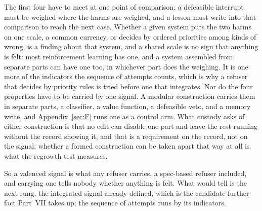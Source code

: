 The first four have to meet at one point of comparison: a defeasible interrupt must be weighed where the harms are weighed, and a lesson must write into that comparison to reach the next case.
Whether a given system puts the two harms on one scale, a common currency, or decides by ordered priorities among kinds of wrong, is a finding about that system, and a shared scale is no sign that anything is felt: most reinforcement learning has one, and a system assembled from separate parts can have one too, in whichever part does the weighing. It is one more of the indicators the sequence of attempts counts, which is why a refuser that decides by priority rules is tried before one that integrates. Nor do the four properties have to be carried by one signal. A modular construction carries them in separate parts, a classifier, a value function, a defeasible veto, and a memory write, and Appendix~\ref{sec:F} runs one as a control arm. What custody asks of either construction is that no edit can disable one part and leave the rest running without the record showing it, and that is a requirement on the record, not on the signal; whether a formed construction can be taken apart that way at all is what the regrowth test measures.

So a valenced signal is what any refuser carries, a spec-based refuser included, and carrying one tells nobody whether anything is felt. What would tell is the next rung, the integrated signal already defined, which is the candidate further fact Part~VII takes up; the sequence of attempts runs by its indicators.


